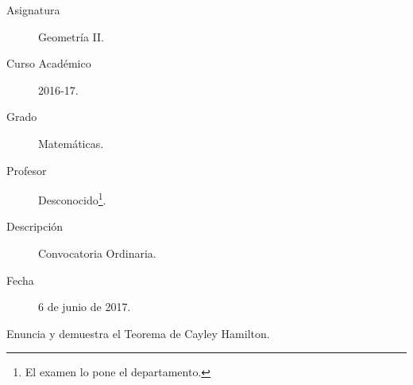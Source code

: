 \documentclass[12pt]{article}
\begin{document}

    
    

    \begin{description}
        \item[Asignatura] Geometría II.
        \item[Curso Académico] 2016-17.
        \item[Grado] Matemáticas.
        \item[Profesor] Desconocido\footnote{El examen lo pone el departamento.}.
        \item[Descripción] Convocatoria Ordinaria.
        \item[Fecha] 6 de junio de 2017.
    
    \end{description}
    \newpage
    
    \begin{ejercicio} 
Enuncia y demuestra el Teorema de Cayley Hamilton.
\end{ejercicio}
\end{document}
